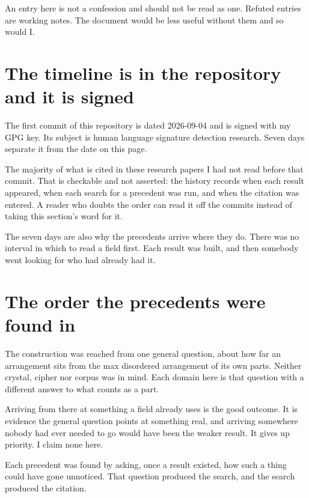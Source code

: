 An entry here is not a confession and should not be read as one. Refuted entries are
working notes. The document would be less useful without them and so would I.

\section*{The timeline is in the repository and it is signed}

The first commit of this repository is dated 2026-09-04 and is signed with my GPG key. Its subject is
human language signature detection research. Seven days separate it from the date on this page.

The majority of what is cited in these research papers I had not read before that commit. That is checkable and not
asserted: the history records when each result appeared, when each search for a precedent was
run, and when the citation was entered. A reader who doubts the order can read it off the commits
instead of taking this section's word for it.

The seven days are also why the precedents arrive where they do. There was no interval in which to
read a field first. Each result was built, and then somebody went looking for who had already had
it.

\section*{The order the precedents were found in}

The construction was reached from one general question, about how far an arrangement sits from the
max disordered arrangement of its own parts. Neither crystal, cipher nor corpus was in mind. Each
domain here is that question with a different answer to what counts as a part.

Arriving from there at something a field already uses is the good outcome. It is evidence the
general question points at something real, and arriving somewhere nobody had ever needed to go would
have been the weaker result. It gives up priority. I claim none here.

Each precedent was found by asking, once a result existed, how such a thing could have gone
unnoticed. That question produced the search, and the search produced the citation.

